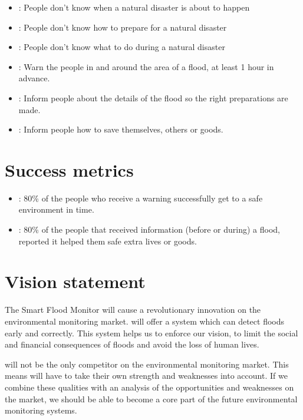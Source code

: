 \begin{itemize}
	\item {}: People don't know when a natural disaster is about to happen
	\item {}: People don't know how to prepare for a natural disaster
	\item {}: People don't know what to do during a natural disaster
\end{itemize}

\begin{itemize}
	\item {}: Warn the people in and around the area of a flood, at least 1 hour in advance.
	\item {}: Inform people about the details of the flood so the right preparations are made. 
	\item {}: Inform people how to save themselves, others or goods.
\end{itemize}

\section{Success metrics}
\begin{itemize}
	\item {}: 80\% of the people who receive a warning successfully get to a safe environment in time.
	\item {}: 80\% of the people that received information (before or during) a flood, reported it helped them safe extra lives or goods.
\end{itemize}

\section{Vision statement}
The Smart Flood Monitor will cause a revolutionary innovation on the environmental monitoring market. \CompanyName will offer a system which can detect floods early and correctly. This system helps us to enforce our vision, to limit the social and financial consequences of floods and avoid the loss of human lives. 

\CompanyName will not be the only competitor on the environmental monitoring market. This means \CompanyName will have to take their own strength and weaknesses into account. If we combine these qualities with an analysis of the opportunities and weaknesses on the market, we should be able to become a core part of the future environmental monitoring systems.\\\\

